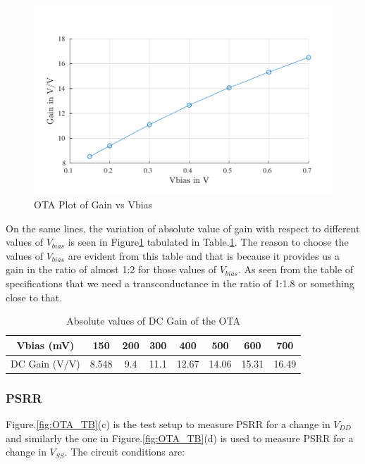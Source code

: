 \begin{figure} [H]
\centering
\includegraphics[scale=1]{Figures/Plots/OTA_Gain_Abs.pdf}
\caption{OTA Plot of Gain vs Vbias}
\label{fig:OTA_gain_abs}
\end{figure}

On the same lines, the variation of absolute value of gain with respect to different values of $V_{bias}$ is seen in Figure\ref{fig:OTA_gain_abs} tabulated in Table.\ref{tab:OTA_gain_abs}. The reason to choose the values of $V_{bias}$ are evident from this table and that is because it provides us a gain in the ratio of almost 1:2 for those values of $V_{bias}$. As seen from the table of specifications that we need a transconductance in the ratio of 1:1.8 or something close to that.

\begin{table} [H]
\centering
\begin{tabular}{@{}cccccccc@{}}
\toprule
Vbias (mV)					& 150			& 200			& 300			& 400			& 500			& 600			& 700 \\ \midrule
DC Gain (V/V)			& 8.548		& 9.4		& 11.1		& 12.67		& 14.06		& 15.31		& 16.49 \\
\bottomrule
\end{tabular}
\caption{Absolute values of DC Gain of the OTA}
\label{tab:OTA_gain_abs}
\end{table}

\subsubsection{PSRR}
Figure.\ref{fig:OTA_TB}(c) is the test setup to measure PSRR for a change in $V_{DD}$ and similarly the one in Figure.\ref{fig:OTA_TB}(d) is used to measure PSRR for a change in $V_{SS}$. The circuit conditions are:

